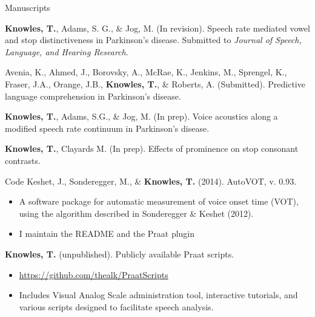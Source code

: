 \documentclass{resume} %
\begin{document}
\begin{rSection}{Manuscripts}

{\bf Knowles, T.}, Adams, S. G., \& Jog, M. (In revision). Speech rate mediated vowel and stop distinctiveness in Parkinson’s disease. Submitted to \emph{Journal of Speech, Language, and Hearing Research}.
	
Avenia, K., Ahmed, J., Borovsky, A., McRae, K., Jenkins, M., Sprengel, K., Fraser, J.A., Orange, J.B., {\bf Knowles, T.}, \& Roberts, A. (Submitted). Predictive language comprehension in Parkinson’s disease.

{\bf Knowles, T.}, Adams, S.G., \& Jog, M. (In prep). Voice acoustics along a modified speech rate continuum in Parkinson's disease.

{\bf Knowles, T.}, Clayards M. (In prep). Effects of prominence on stop consonant contrasts.

\end{rSection}



\begin{rSection}{Code}
	Keshet, J., Sonderegger, M., \& {\bf Knowles, T.} (2014). AutoVOT, v. 0.93.
	\begin{itemize}
			\renewcommand\labelitemi{$\cdot$}
		\item A software package for automatic measurement of voice onset time (VOT), using the algorithm described in Sonderegger \& Keshet (2012).
		\item I maintain the README and the Praat plugin
	\end{itemize}
	
	{\bf Knowles, T.} (unpublished). Publicly available Praat scripts.
	\begin{itemize}
			\renewcommand\labelitemi{$\cdot$}
		\item \url{https://github.com/thealk/PraatScripts}
		\item Includes Visual Analog Scale administration tool, interactive tutorials, and various scripts designed to facilitate speech analysis.
	\end{itemize}
\end{rSection}


\end{document}
